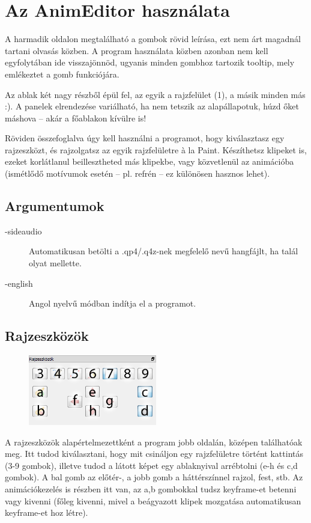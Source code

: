 \documentclass[a4paper,12pt,release]{article}
\begin{document}
\section{Az AnimEditor használata}
A harmadik oldalon megtalálható a gombok rövid leírása, ezt nem árt magadnál tartani olvasás közben. A program használata közben azonban nem kell egyfolytában ide visszajönnöd, ugyanis minden gombhoz tartozik tooltip, mely emlékeztet a gomb funkciójára.

Az ablak két nagy részből épül fel, az egyik a rajzfelület (1), a másik minden más :). A panelek elrendezése variálható, ha nem tetszik az alapállapotuk, húzd őket máshova -- akár a főablakon kívülre is!

Röviden összefoglalva úgy kell használni a programot, hogy kiválasztasz egy rajzeszközt, és rajzolgatsz az egyik rajzfelületre \`a la Paint. Készíthetsz klipeket is, ezeket korlátlanul beillesztheted más klipekbe, vagy közvetlenül az animációba (ismétlődő motívumok esetén -- pl. refrén -- ez különösen hasznos lehet).

\subsection{Argumentumok}
\begin{description}
\item[-sideaudio] Automatikusan betölti a .qp4/.q4z-nek megfelelő nevű hangfájlt, ha talál olyat mellette.
\item[-english] Angol nyelvű módban indítja el a programot.
\end{description}

\subsection{Rajzeszközök}
\begin{figure}
	\vspace{-27pt}
	\begin{center}
		\includegraphics[width=0.5\textwidth]{pics/tools.png}
	\end{center}
	\vspace{-20pt}
\end{figure}
A rajzeszközök alapértelmezettként a program jobb oldalán, középen találhatóak meg. Itt tudod kiválasztani, hogy mit csináljon egy rajzfelületre történt kattintás (3-9 gombok), illetve tudod a látott képet egy ablaknyival arrébtolni (e-h és c,d gombok). A bal gomb az előtér-, a jobb gomb a háttérszínnel rajzol, fest, stb. Az animációkezelés is részben itt van, az a,b gombokkal tudsz keyframe-et betenni vagy kivenni (főleg kivenni, mivel a beágyazott klipek mozgatása automatikusan keyframe-et hoz létre).
\end{document}
